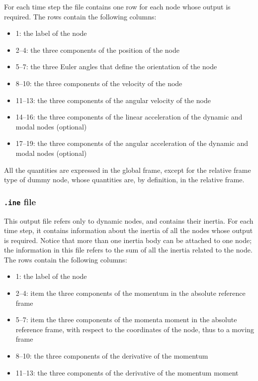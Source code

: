 For each time step the file contains one row for each node whose output is required. The rows contain the following columns:
\begin{itemize}
    \item 1: the label of the node
    \item 2–4: the three components of the position of the node
    \item 5–7: the three Euler angles that define the orientation of the node
    \item 8–10: the three components of the velocity of the node
    \item 11–13: the three components of the angular velocity of the node
    \item 14–16: the three components of the linear acceleration of the dynamic and modal nodes (optional)
    \item 17–19: the three components of the angular acceleration of the dynamic and modal nodes (optional)
\end{itemize}

All the quantities are expressed in the global frame, except for the relative frame type of dummy node, whose quantities are, by definition, in the relative frame.

\subsubsection{\texttt{.ine} file}

This output file refers only to dynamic nodes, and contains their inertia. For each time step, it contains information about the inertia of all the nodes whose output is required. Notice that more than one inertia body can be attached to one node; the information in this file refers to the sum of all the inertia related to the node.
The rows contain the following columns:

\begin{itemize}
    \item 1: the label of the node
    \item 2–4: item the three components of the momentum in the absolute reference frame
    \item 5–7: item the three components of the momenta moment in the absolute reference frame, with respect to the coordinates of the node, thus to a moving frame
    \item 8–10: the three components of the derivative of the momentum
    \item 11–13: the three components of the derivative of the momentum moment
\end{itemize}
 
